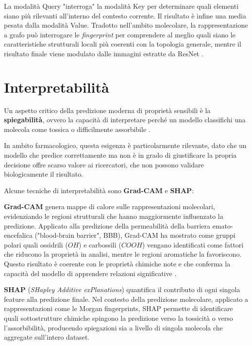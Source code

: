 La modalità Query "interroga" la modalità Key per determinare quali elementi siano più rilevanti all'interno del contesto corrente. Il risultato è infine una media pesata dalla modalità Value. Tradotto nell'ambito molecolare, la rappresentazione a grafo può interrogare le \textit{fingerprint} per comprendere al meglio quali siano le caratteristiche strutturali locali più coerenti con la topologia generale, mentre il risultato finale viene modulato dalle immagini estratte da ResNet
\cite{liEnhancingADMETProperty2026a}.


\section{Interpretabilità}
Un aspetto critico della predizione moderna di proprietà sensibili è la \textbf{spiegabilità}, ovvero la capacità di interpretare perché un modello classifichi una molecola come tossica o difficilmente assorbibile \cite{liEnhancingADMETProperty2026a}.

In ambito farmacologico, questa esigenza è particolarmente rilevante, dato che un modello che predice correttamente ma non è in grado di giustificare la propria decisione offre scarso valore ai ricercatori, che non possono validare biologicamente il risultato.

Alcune tecniche di interpretabilità sono \textbf{Grad-CAM} e \textbf{SHAP}:

\textbf{Grad-CAM}
genera mappe di calore sulle rappresentazioni molecolari, evidenziando 
le regioni strutturali che hanno maggiormente influenzato la predizione. 
Applicato alla predizione della permeabilità della barriera 
emato-encefalica ("blood-brain barrier", BBB), Grad-CAM ha mostrato come gruppi polari quali 
ossidrili ($OH$) e carbossili ($COOH$) vengano identificati come 
fattori che riducono la proprietà in analisi, mentre le regioni aromatiche la 
favoriscono. Questo risultato è coerente con le proprietà chimiche 
note e che conferma la capacità del modello di apprendere 
relazioni significative \cite{liEnhancingADMETProperty2026a}.

\textbf{SHAP} (\textit{SHapley Additive exPlanations}) quantifica il contributo di ogni singola 
feature alla predizione finale. 
Nel contesto della predizione molecolare, 
applicato a rappresentazioni come le Morgan fingerprints, SHAP permette 
di identificare quali sottostrutture chimiche spingono la predizione verso 
la tossicità o verso l'assorbibilità, producendo spiegazioni sia a livello 
di singola molecola che aggregate sull'intero dataset.